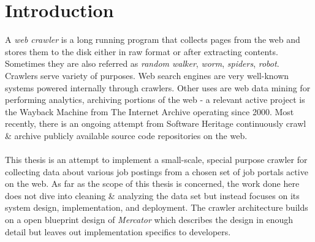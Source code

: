 \chapter{Introduction}
A \textit{web crawler} is a long running program that collects pages from the web and stores them to the
disk either in raw format or after extracting contents. Sometimes they are also referred as
\textit{random walker}, \textit{worm}, \textit{spiders}, \textit{robot}. Crawlers serve variety of
purposes. Web search engines are very well-known systems powered internally through crawlers.
Other uses are web data mining for performing analytics, archiving portions of the web - a
relevant active project is the Wayback Machine from The Internet Archive\cite{netarchive} operating since 2000. Most recently,
there is an ongoing attempt from Software Heritage\cite{swheritage} continuously crawl \& archive publicly available source code repositories on the web.
\\
\\
This thesis is an attempt to implement a small-scale, special purpose crawler for collecting data about
various job postings from a chosen set of job portals active on the web. As far as the scope of this thesis
is concerned, the work done here does not dive into cleaning \& analyzing the data set but instead focuses on its system design, implementation, and deployment. The crawler architecture builds on a open blueprint design of \textit{Mercator}\cite{mercator} which describes the design in enough detail but leaves out implementation specifics to developers.

\pagebreak

